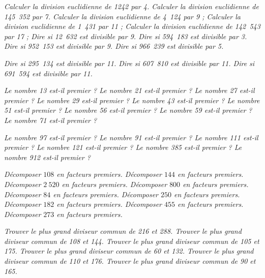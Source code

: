 
  \if{} \it  Calculer la division euclidienne de 1242 par 4.\fi
  \if{} \it  Calculer la division euclidienne de 145~352 par 7.\fi
  \if{} \it  Calculer la division euclidienne de 4~124 par 9 ;\fi
  \if{} \it  Calculer la division euclidienne de 1~431 par 11 ;\fi
  \if{} \it  Calculer la division euclidienne de 142~543 par 17 ; \fi
  \if{} \it Dire si 12~632 est divisible par 9.\fi
  \if{}\it Dire si  594~183 est divisible par 3.\fi
  \if{} \it Dire si 952~153 est divisible par 9.\fi
  \if{} \it Dire si 966~239 est divisible par 5.\fi
  
  \if{} \it Dire si 295~134 est divisible par 11.\fi
  \if{} \it Dire si 607~810 est divisible par 11.\fi
  \if{} \it Dire si 691~594 est divisible par 11.\fi
  
  
  \if{} \it Le nombre 13 est-il premier ? \fi
  \if{} \it Le nombre 21 est-il premier ? \fi
  \if{} \it Le nombre 27 est-il premier ? \fi
  \if{} \it Le nombre 29 est-il premier ? \fi
  \if{} \it Le nombre 43 est-il premier ? \fi
  \if{} \it Le nombre 51 est-il premier ? \fi
  \if{} \it Le nombre 56 est-il premier ? \fi
  \if{} \it Le nombre 59 est-il premier ? \fi
  \if{} \it Le nombre 71 est-il premier ? \fi 
  
  \if{} \it Le nombre 97 est-il premier ? \fi
  \if{} \it Le nombre 91 est-il premier ? \fi
  \if{} \it Le nombre 111 est-il premier ? \fi
  \if{} \it  Le nombre 121 est-il premier ? \fi
  \if{} \it Le nombre 385 est-il premier ? \fi
  \if{} \it Le nombre 912 est-il premier ? \fi
  
  \if{} \it Décomposer $108$ en facteurs premiers. \fi 
  \if{} \it Décomposer $144$ en facteurs premiers. \fi 
  \if{} \it Décomposer $2~520$ en facteurs premiers. \fi 
  \if{} \it Décomposer $800$ en facteurs premiers. \fi 
  \if{} \it Décomposer $84$ en facteurs premiers. \fi 
  \if{} \it Décomposer $250$ en facteurs premiers. \fi 
  \if{} \it Décomposer $182$ en facteurs premiers. \fi 
  \if{} \it Décomposer $455$ en facteurs premiers. \fi 
  \if{} \it Décomposer $273$ en facteurs premiers. \fi  
  
   
   \if{} \it Trouver le plus grand diviseur commun de 216 et 288. \fi 
   \if{} \it Trouver le plus grand diviseur commun de 108 et 144. \fi 
   \if{} \it Trouver le plus grand diviseur commun de 105 et 175. \fi 
   \if{} \it Trouver le plus grand diviseur commun de 60 et 132. \fi 
   \if{} \it Trouver le plus grand diviseur commun de 110 et 176. \fi 
   \if{} \it Trouver le plus grand diviseur commun de 90 et 165. \fi 
  
